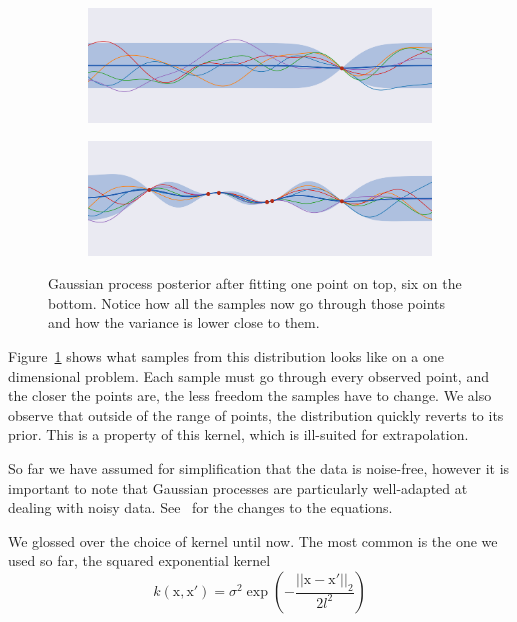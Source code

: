 \begin{figure}[htb]
    \centering
    \begin{subfigure}[b]{\textwidth}
        \includegraphics[width=\textwidth]{img_hyperopt/gp_posterior_1_point}
    \end{subfigure}

    \begin{subfigure}[b]{\textwidth}
        \includegraphics[width=\textwidth]{img_hyperopt/gp_posterior_6_point}
    \end{subfigure}
    \caption{Gaussian process posterior after fitting one point on top, six on the bottom. Notice how all the samples now go through those points and how the variance is lower close to them.}
    \label{fig:gp_posterior}
\end{figure}

Figure~\ref{fig:gp_posterior} shows what samples from this distribution looks like on a one dimensional problem. Each sample must go through every observed point, and the closer the points are, the less freedom the samples have to change. We also observe that outside of the range of points, the distribution quickly reverts to its prior. This is a property of this kernel, which is ill-suited for extrapolation.

So far we have assumed for simplification that the data is noise-free, however it is important to note that Gaussian processes are particularly well-adapted at dealing with noisy data. See~\textcite{rasmussen2005} for the changes to the equations.

We glossed over the choice of kernel until now. The most common is the one we used so far, the squared exponential kernel
\begin{equation}
	k(\mathrm{x}, \mathrm{x'}) = \sigma^2 \exp\left( -\frac{||\mathrm{x} - \mathrm{x'}||_2}{2l^2}\right)
\end{equation}

